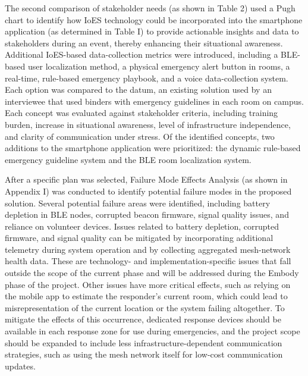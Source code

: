 \documentclass[english,12pt,a4paper,titlepage]{article}
\begin{document}
	The second comparison of stakeholder needs (as shown in Table 2) used a Pugh chart to identify how IoES technology could be incorporated into the smartphone application (as determined in Table I) to provide actionable insights and data to stakeholders during an event, thereby enhancing their situational awareness. Additional IoES-based data-collection metrics were introduced, including a BLE-based user localization method, a physical emergency alert button in rooms, a real-time, rule-based emergency playbook, and a voice data-collection system. Each option was compared to the datum, an existing solution used by an interviewee that used binders with emergency guidelines in each room on campus. Each concept was evaluated against stakeholder criteria, including training burden, increase in situational awareness, level of infrastructure independence, and clarity of communication under stress. Of the identified concepts, two additions to the smartphone application were prioritized: the dynamic rule-based emergency guideline system and the BLE room localization system.
	
	After a specific plan was selected, Failure Mode Effects Analysis (as shown in Appendix I) was conducted to identify potential failure modes in the proposed solution. Several potential failure areas were identified, including battery depletion in BLE nodes, corrupted beacon firmware, signal quality issues, and reliance on volunteer devices. Issues related to battery depletion, corrupted firmware, and signal quality can be mitigated by incorporating additional telemetry during system operation and by collecting aggregated mesh-network health data. These are technology- and implementation-specific issues that fall outside the scope of the current phase and will be addressed during the Embody phase of the project. Other issues have more critical effects, such as relying on the mobile app to estimate the responder’s current room, which could lead to misrepresentation of the current location or the system failing altogether. To mitigate the effects of this occurrence, dedicated response devices should be available in each response zone for use during emergencies, and the project scope should be expanded to include less infrastructure-dependent communication strategies, such as using the mesh network itself for low-cost communication updates.
	
\end{document}
